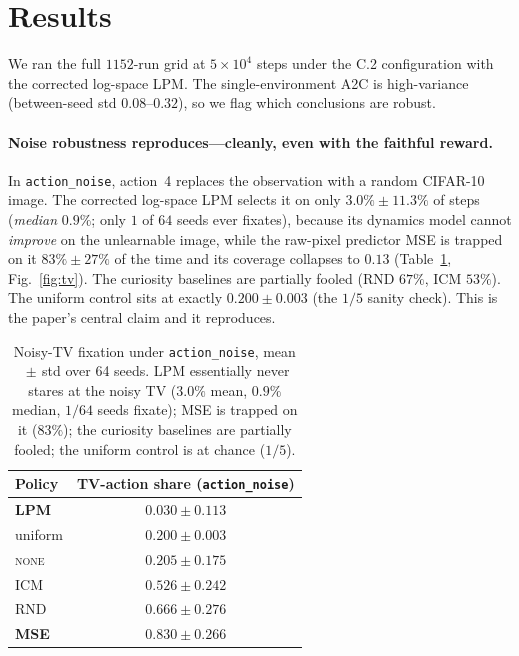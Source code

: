 \documentclass[11pt]{article}
\begin{document}
\section{Results}
We ran the full $1152$-run grid at $5\times10^{4}$ steps under the C.2 configuration with the
corrected log-space LPM. The single-environment A2C is high-variance (between-seed std
$0.08$--$0.32$), so we flag which conclusions are robust.

\paragraph{Noise robustness reproduces---cleanly, even with the faithful reward.} In
\texttt{action\_noise}, action~4 replaces the observation with a random CIFAR-10 image. The corrected
log-space LPM selects it on only $3.0\%\pm11.3\%$ of steps (\emph{median} $0.9\%$; only $1$ of $64$
seeds ever fixates), because its dynamics model cannot \emph{improve} on the unlearnable image, while
the raw-pixel predictor MSE is trapped on it $83\%\pm27\%$ of the time and its coverage collapses to
$0.13$ (Table~\ref{tab:tv}, Fig.~\ref{fig:tv}). The curiosity baselines are partially fooled
(RND $67\%$, ICM $53\%$). The uniform control sits at exactly $0.200\pm0.003$ (the $1/5$ sanity
check). This is the paper's central claim and it reproduces.

\begin{table}[h]
\centering
\begin{tabular}{@{}lc@{}}
\toprule
\textbf{Policy} & \textbf{TV-action share} (\texttt{action\_noise}) \\
\midrule
\textbf{LPM}  & $\mathbf{0.030 \pm 0.113}$ \\
uniform       & $0.200 \pm 0.003$ \\
\textsc{none} & $0.205 \pm 0.175$ \\
ICM           & $0.526 \pm 0.242$ \\
RND           & $0.666 \pm 0.276$ \\
\textbf{MSE}  & $\mathbf{0.830 \pm 0.266}$ \\
\bottomrule
\end{tabular}
\caption{Noisy-TV fixation under \texttt{action\_noise}, mean$\,\pm\,$std over 64 seeds. LPM
essentially never stares at the noisy TV ($3.0\%$ mean, $0.9\%$ median, $1/64$ seeds fixate); MSE is
trapped on it ($83\%$); the curiosity baselines are partially fooled; the uniform control is at
chance ($1/5$).}
\label{tab:tv}
\end{table}
\end{document}
